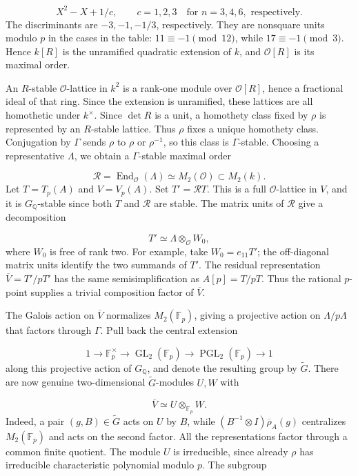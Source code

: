 \documentclass[11pt]{article}
\newcommand{\Q}{\mathbb Q}
\newcommand{\F}{\mathbb F}
\DeclareMathOperator{\End}{End}
\DeclareMathOperator{\GL}{GL}
\DeclareMathOperator{\PGL}{PGL}
\begin{document}
\[
X^2-X+1/c,\qquad c=1,2,3\quad\text{for }n=3,4,6,\text{ respectively}.
\]
The discriminants are \(-3,-1,-1/3\), respectively. They are nonsquare units modulo \(p\) in the cases in the table: \(11\equiv-1\pmod{12}\), while \(17\equiv-1\pmod3\). Hence \(k[R]\) is the unramified quadratic extension of \(k\), and \(\mathcal O[R]\) is its maximal order.

An \(R\)-stable \(\mathcal O\)-lattice in \(k^2\) is a rank-one module over \(\mathcal O[R]\), hence a fractional ideal of that ring. Since the extension is unramified, these lattices are all homothetic under \(k^\times\). Since \(\det R\) is a unit, a homothety class fixed by \(\rho\) is represented by an \(R\)-stable lattice. Thus \(\rho\) fixes a unique homothety class. Conjugation by \(\Gamma\) sends \(\rho\) to \(\rho\) or \(\rho^{-1}\), so this class is \(\Gamma\)-stable. Choosing a representative \(\Lambda\), we obtain a \(\Gamma\)-stable maximal order

\[
\mathcal R=\End_{\mathcal O}(\Lambda)\simeq M_2(\mathcal O)\subset M_2(k).
\]
Let \(T=T_p(A)\) and \(V=V_p(A)\). Set \(T'=\mathcal R T\). This is a full \(\mathcal O\)-lattice in \(V\), and it is \(G_{\Q}\)-stable since both \(T\) and \(\mathcal R\) are stable. The matrix units of \(\mathcal R\) give a decomposition

\[
T'\simeq\Lambda\otimes_{\mathcal O}W_0,
\]
where \(W_0\) is free of rank two. For example, take \(W_0=e_{11}T'\); the off-diagonal matrix units identify the two summands of \(T'\). The residual representation \(\overline V=T'/pT'\) has the same semisimplification as \(A[p]=T/pT\). Thus the rational \(p\)-point supplies a trivial composition factor of \(\overline V\).

The Galois action on \(\overline V\) normalizes \(M_2(\F_p)\), giving a projective action on \(\Lambda/p\Lambda\) that factors through \(\Gamma\). Pull back the central extension

\[
1\longrightarrow\F_p^\times\longrightarrow\GL_2(\F_p)
\longrightarrow\PGL_2(\F_p)\longrightarrow1
\]
along this projective action of \(G_{\Q}\), and denote the resulting group by \(\widetilde G\). There are now genuine two-dimensional \(\widetilde G\)-modules \(U,W\) with

\[
\overline V\simeq U\otimes_{\F_p}W.
\]
Indeed, a pair \((g,B)\in\widetilde G\) acts on \(U\) by \(B\), while \((B^{-1}\otimes I)\overline\rho_A(g)\) centralizes \(M_2(\F_p)\) and acts on the second factor. All the representations factor through a common finite quotient. The module \(U\) is irreducible, since already \(\rho\) has irreducible characteristic polynomial modulo \(p\). The subgroup
\end{document}
